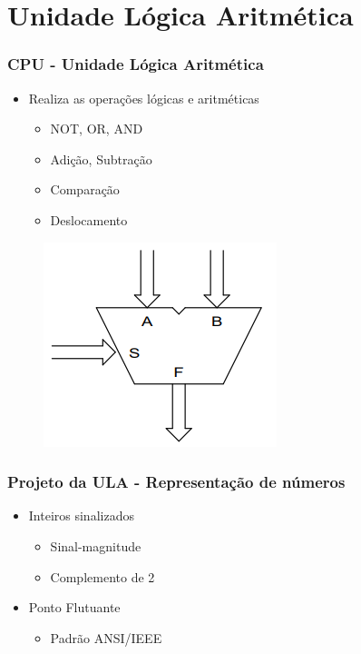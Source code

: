 \documentclass[aspectratio=169,
				xcolor=table]{beamer}
\begin{document}
	\section{Unidade Lógica Aritmética}
		\begin{frame}
			\frametitle{CPU - Unidade Lógica Aritmética}
			\begin{itemize}
				\item Realiza as operações lógicas e aritméticas
				\begin{itemize}
					\item NOT, OR, AND
					\item Adição, Subtração
					\item Comparação
					\item Deslocamento
				\end{itemize}				
			\end{itemize}
			\begin{figure}
			\vspace{-1.5cm}
				\centering
				\includegraphics[height=0.6\textheight, keepaspectratio]{../figs/cap04/ula} 
			\end{figure}
		\end{frame}
		
		\begin{frame}
			\frametitle{Projeto da ULA - Representação de números}
				\begin{itemize}
					\item Inteiros sinalizados
					\begin{itemize}
						\item Sinal-magnitude
						\item \alert{Complemento de 2}
					\end{itemize}
					\vspace{1em}
					\item Ponto Flutuante
					\begin{itemize}
						\item \alert{Padrão ANSI/IEEE}
					\end{itemize}
				\end{itemize}
		\end{frame}		
\end{document}
